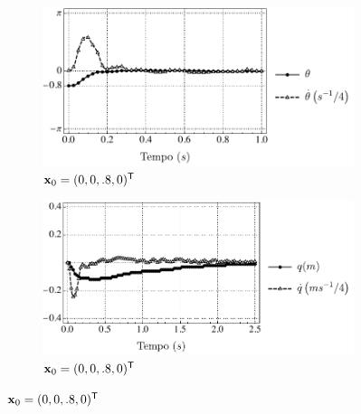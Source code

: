 \begin{figure}
    \vskip 0pt
    \centering
    \begin{subfigure}[t]{0.48\textwidth}
        \centering
        \includegraphics[width=\textwidth]{assets/theta-limit-angle8}
        \caption{$\mathbf{x}_0 = (0, 0, .8, 0)^{\mathsf{T}}$}
    \end{subfigure}
    \hfill
    \begin{subfigure}[t]{0.48\textwidth}
        \centering
        \includegraphics[width=\textwidth]{assets/theta-limit-pos8}
        \caption{$\mathbf{x}_0 = (0, 0, .8, 0)^{\mathsf{T}}$}
    \end{subfigure}


\end{figure}
